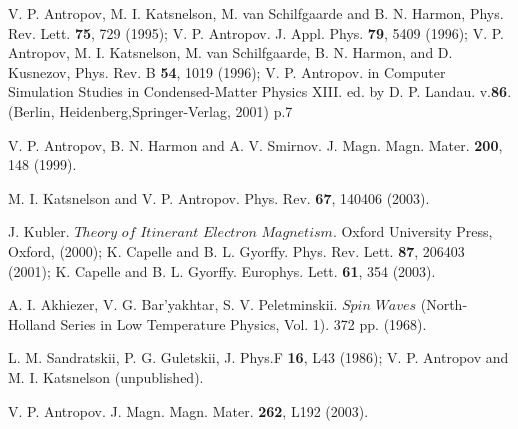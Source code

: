 \documentclass[aps,preprint,twocolumn,10pt]{revtex4}%
\begin{document}
\begin{thebibliography}{9}                                                                                                %


V. P. Antropov, M. I. Katsnelson, M. van Schilfgaarde and B. N.
Harmon, Phys. Rev. Lett. \textbf{75}, 729 (1995); V. P. Antropov. J. Appl.
Phys. \textbf{79}, 5409 (1996); V. P. Antropov, M. I. Katsnelson, M. van
Schilfgaarde, B. N. Harmon, and D. Kusnezov, Phys. Rev. B \textbf{54}, 1019
(1996); V. P. Antropov. in Computer Simulation Studies in Condensed-Matter
Physics XIII. ed. by D. P. Landau. v.\textbf{86}. (Berlin,
Heidenberg,Springer-Verlag, 2001) p.7

V. P. Antropov, B. N. Harmon and A. V. Smirnov. J. Magn. Magn.
Mater. \textbf{200}, 148 (1999).

M. I. Katsnelson and V. P. Antropov. Phys. Rev. \textbf{67},
140406 (2003).

J. Kubler. $Theory$ $of$ $Itinerant$ $Electron$ $Magnetism$.
Oxford University Press, Oxford, (2000); K. Capelle and B. L. Gyorffy. Phys.
Rev. Lett. \textbf{87}, 206403 (2001); K. Capelle and B. L. Gyorffy. Europhys.
Lett. \textbf{61}, 354 (2003).

A. I. Akhiezer, V. G. Bar'yakhtar, S. V. Peletminskii. $Spin$
$Waves$ (North-Holland Series in Low Temperature Physics, Vol. 1). 372 pp. (1968).

L. M. Sandratskii, P. G. Guletskii, J. Phys.F \textbf{16}, L43
(1986); V. P. Antropov and M. I. Katsnelson (unpublished).

V. P. Antropov. J. Magn. Magn. Mater. \textbf{262}, L192 (2003).
\end{thebibliography}
\end{document}
